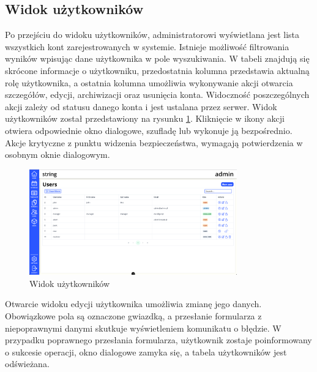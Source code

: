 \subsection{Widok użytkowników}

Po przejściu do widoku użytkowników, administratorowi wyświetlana jest lista wszystkich kont zarejestrowanych w systemie. Istnieje możliwość filtrowania wyników wpisując dane użytkownika w pole wyszukiwania. W tabeli znajdują się skrócone informacje o użytkowniku, przedostatnia kolumna przedstawia aktualną rolę użytkownika, a ostatnia kolumna umożliwia wykonywanie akcji otwarcia szczegółów, edycji, archiwizacji oraz usunięcia konta. Widoczność poszczególnych akcji zależy od statusu danego konta i jest ustalana przez serwer. Widok użytkowników został przedstawiony na rysunku \ref{fig:usersView}. Kliknięcie w ikony akcji otwiera odpowiednie okno dialogowe, szufladę lub wykonuje ją bezpośrednio. Akcje krytyczne z punktu widzenia bezpieczeństwa, wymagają potwierdzenia w osobnym oknie dialogowym.

\begin{figure}[H]
    \centering
    \includegraphics[width=0.8\textwidth, frame]{graf/front/users.png}
    \caption{Widok użytkowników}
    \label{fig:usersView}
\end{figure}

Otwarcie widoku edycji użytkownika umożliwia zmianę jego danych. Obowiązkowe pola są oznaczone gwiazdką, a przesłanie formularza z niepoprawnymi danymi skutkuje wyświetleniem komunikatu o błędzie. W przypadku poprawnego przesłania formularza, użytkownik zostaje poinformowany o sukcesie operacji, okno dialogowe zamyka się, a tabela użytkowników jest odświeżana.

